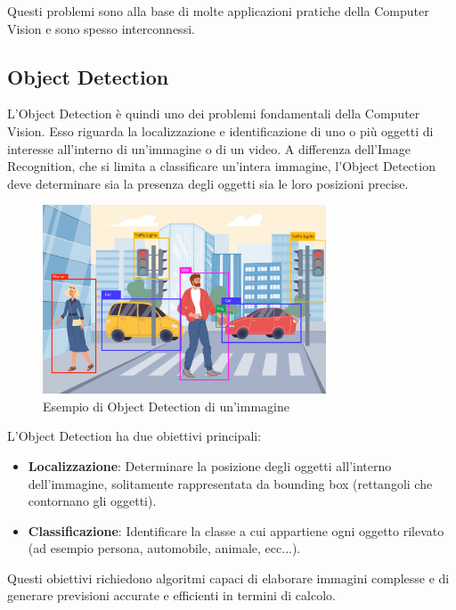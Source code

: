 Questi problemi sono alla base di molte applicazioni pratiche della Computer Vision e sono spesso interconnessi.


\subsection{Object Detection}
L'Object Detection è quindi uno dei problemi fondamentali della Computer Vision. Esso riguarda la localizzazione e identificazione di uno o più oggetti di interesse all'interno di un'immagine o di un video. A differenza dell'Image Recognition, che si limita a classificare un'intera immagine, l'Object Detection deve determinare sia la presenza degli oggetti sia le loro posizioni precise.

\begin{figure}[ht]
    \centering
    \includegraphics[width=0.75\textwidth]{files/capitoli/1-object-detection/assets/object-detection-example.png}
    \caption{\label{fig:object-detection-example}Esempio di Object Detection di un'immagine\cite{1}}
\end{figure}

L'Object Detection ha due obiettivi principali:
\begin{itemize}
  \item \textbf{Localizzazione}: Determinare la posizione degli oggetti all'interno dell'immagine, solitamente rappresentata da bounding box (rettangoli che contornano gli oggetti).
  \item \textbf{Classificazione}: Identificare la classe a cui appartiene ogni oggetto rilevato (ad esempio persona, automobile, animale, ecc...).
\end{itemize}

Questi obiettivi richiedono algoritmi capaci di elaborare immagini complesse e di generare previsioni accurate e efficienti in termini di calcolo.

